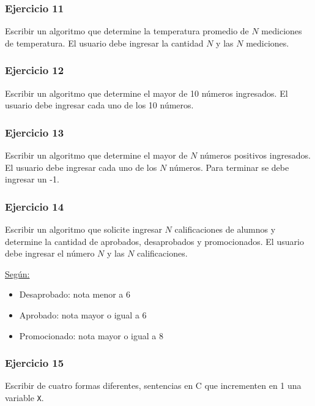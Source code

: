 \subsubsection{Ejercicio 11}
Escribir un algoritmo que determine la temperatura promedio de $N$ mediciones de temperatura. El usuario debe ingresar la cantidad $N$ y las $N$ mediciones. 

\subsubsection{Ejercicio 12}
Escribir un algoritmo que determine el mayor de 10 números ingresados. El usuario debe ingresar cada uno de los 10 números.

\subsubsection{Ejercicio 13}
Escribir un algoritmo que determine el mayor de $N$ números positivos ingresados. El usuario debe ingresar cada uno de los $N$ números. Para terminar se debe ingresar un -1.

\subsubsection{Ejercicio 14}
Escribir un algoritmo que solicite ingresar $N$ calificaciones de alumnos y determine la cantidad de aprobados, desaprobados y promocionados. 
El usuario debe ingresar el número $N$ y las $N$ calificaciones.

\underline{Según:}
\begin{itemize}
  \item Desaprobado: nota menor a 6
  \item Aprobado: nota mayor o igual a 6
  \item Promocionado: nota mayor o igual a 8
\end{itemize}

\subsubsection{Ejercicio 15}
Escribir de cuatro formas diferentes, sentencias en C que incrementen en 1 una variable \texttt{X}.
